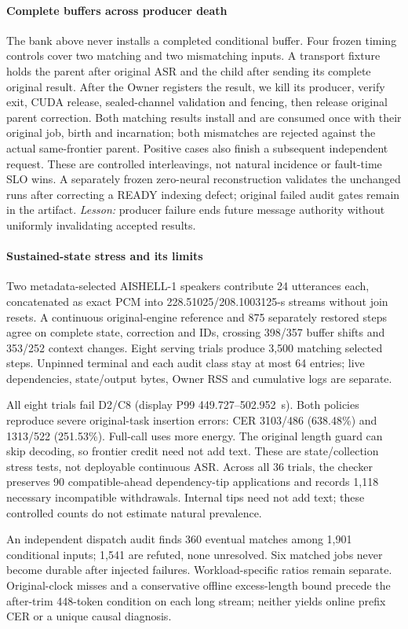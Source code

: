 \paragraph{Complete buffers across producer death}
The bank above never installs a completed conditional buffer. Four frozen
timing controls cover two matching and two mismatching inputs. A transport
fixture holds the parent after original ASR and the child after sending
its complete original result. After the Owner registers the result, we
kill its producer, verify exit, CUDA release, sealed-channel validation
and fencing, then release original parent correction. Both matching
results install and are consumed once with their original job, birth and
incarnation; both mismatches are rejected against the actual same-frontier
parent. Positive cases also finish a subsequent independent request.
These are controlled interleavings, not natural incidence or fault-time
SLO wins. A separately frozen zero-neural reconstruction validates the
unchanged runs after correcting a READY indexing defect; original failed
audit gates remain in the artifact. \emph{Lesson:} producer failure ends
future message authority without uniformly invalidating accepted results.

\paragraph{Sustained-state stress and its limits}
Two metadata-selected AISHELL-1 speakers contribute 24 utterances each,
concatenated as exact PCM into 228.51025/208.1003125-s streams without
join resets. A continuous original-engine reference and 875 separately
restored steps agree on complete state, correction and IDs, crossing
398/357 buffer shifts and 353/252 context changes. Eight serving trials
produce 3,500 matching selected steps. Unpinned terminal and each audit
class stay at most 64 entries; live dependencies, state/output bytes,
Owner RSS and cumulative logs are separate.

All eight trials fail D2/C8 (display P99 449.727--502.952~s). Both policies
reproduce severe original-task insertion errors: CER 3103/486 (638.48\%)
and 1313/522 (251.53\%). Full-call uses more energy. The original length
guard can skip decoding, so frontier credit need not add text. These are
state/collection stress tests, not deployable continuous ASR. Across all
36 trials, the checker preserves 90 compatible-ahead dependency-tip
applications and records 1,118 necessary incompatible withdrawals. Internal
tips need not add text; these controlled counts do not estimate natural
prevalence.

An independent dispatch audit finds 360 eventual matches among 1,901
conditional inputs; 1,541 are refuted, none unresolved. Six matched jobs
never become durable after injected failures. Workload-specific ratios
remain separate. Original-clock misses and a conservative offline
excess-length bound precede the after-trim 448-token condition on each
long stream; neither yields online prefix CER or a unique causal diagnosis.
